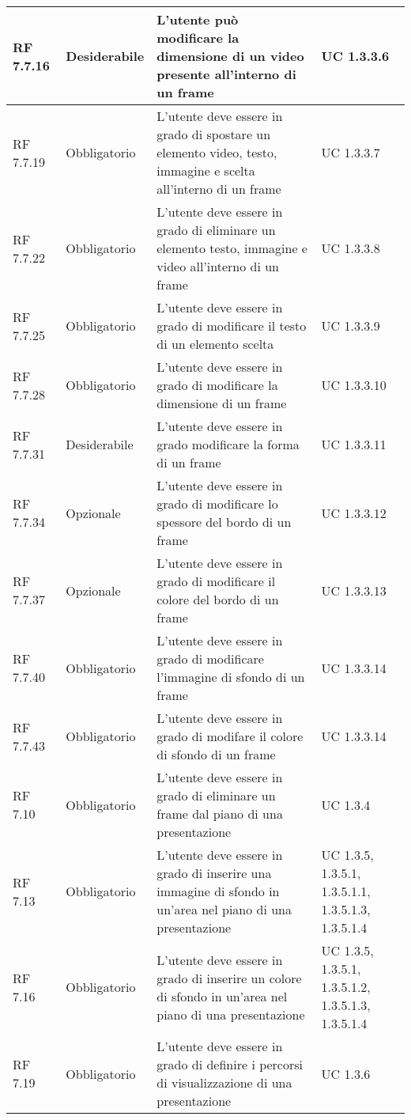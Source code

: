 {\begin{longtable} [c]{| p{2.5cm} | p{2.5cm} | p{6cm} |p{2.5cm}|}
			\hline
			RF 7.7.16 & Desiderabile & L'utente può modificare la dimensione di un video presente all'interno di un frame & UC 1.3.3.6\\
			\hline
			RF 7.7.19 & Obbligatorio & L'utente deve essere in grado di spostare un elemento video, testo, immagine e scelta all'interno di un frame & UC 1.3.3.7\\
			\hline
			RF 7.7.22 & Obbligatorio & L'utente deve essere in grado di eliminare un elemento testo, immagine e video all'interno di un frame & UC 1.3.3.8\\
			\hline
			RF 7.7.25 & Obbligatorio & L'utente deve essere in grado di modificare il testo di un elemento scelta & UC 1.3.3.9\\
			\hline
			RF 7.7.28 & Obbligatorio & L'utente deve essere in grado di modificare la dimensione di un frame & UC 1.3.3.10\\
			\hline
			RF 7.7.31 & Desiderabile & L'utente deve essere in grado modificare la forma di un frame & UC 1.3.3.11\\
			\hline
			RF 7.7.34 & Opzionale & L'utente deve essere in grado di modificare lo spessore del bordo di un frame & UC 1.3.3.12\\
			\hline
			RF 7.7.37 & Opzionale & L'utente deve essere in grado di modificare il colore del bordo di un frame & UC 1.3.3.13\\
			\hline
			RF 7.7.40 & Obbligatorio & L'utente deve essere in grado di modificare l'immagine di sfondo di un frame & UC 1.3.3.14\\
			\hline
			RF 7.7.43 & Obbligatorio & L'utente deve essere in grado di modifare il colore di sfondo di un frame & UC 1.3.3.14\\
			\hline
			RF 7.10 & Obbligatorio & L'utente deve essere in grado di eliminare un frame dal piano di  una presentazione & UC 1.3.4\\
			\hline
			RF 7.13 & Obbligatorio & L'utente deve essere in grado di inserire una immagine di sfondo in un’area nel piano di una presentazione & UC 1.3.5, 1.3.5.1, 1.3.5.1.1, 1.3.5.1.3, 1.3.5.1.4\\
			\hline
			RF 7.16 & Obbligatorio & L'utente deve essere in grado di inserire un colore di sfondo in un’area nel piano di una presentazione & UC 1.3.5, 1.3.5.1, 1.3.5.1.2, 1.3.5.1.3, 1.3.5.1.4\\
			\hline
			RF 7.19 & Obbligatorio & L'utente deve essere in grado di definire i percorsi di visualizzazione di una presentazione & UC 1.3.6\\
			\hline

\end{longtable}}
